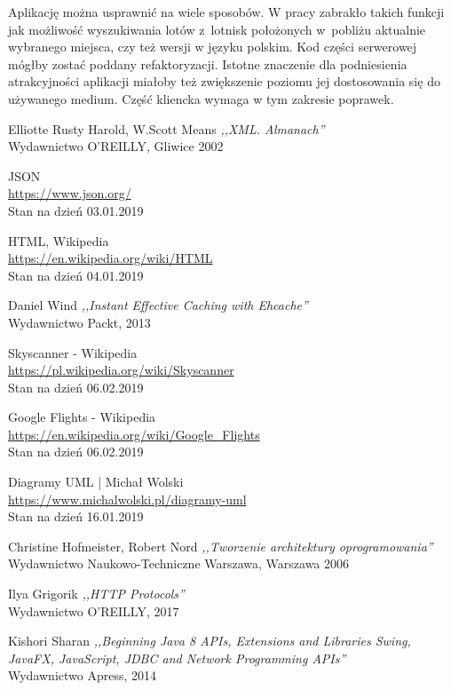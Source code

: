 \documentclass[12pt, twoside]{report}
\begin{document}
Aplikację można usprawnić na wiele sposobów. W pracy zabrakło takich funkcji jak możliwość wyszukiwania lotów z~lotnisk położonych w~pobliżu aktualnie wybranego miejsca, czy też  wersji w języku polskim. Kod części serwerowej mógłby zostać poddany refaktoryzacji. Istotne znaczenie dla podniesienia atrakcyjności aplikacji miałoby też zwiększenie poziomu jej dostosowania się do używanego medium. Część kliencka wymaga w tym zakresie poprawek. 
\begin{thebibliography}{9}

Elliotte Rusty Harold, W.Scott Means \emph{ ,,XML. Almanach'' } \\
Wydawnictwo O'REILLY, Gliwice 2002

  JSON \\
  \url{https://www.json.org/} \\
  Stan na dzień 03.01.2019

    HTML, Wikipedia \\
	\url{https://en.wikipedia.org/wiki/HTML} \\
	Stan na dzień 04.01.2019
	
Daniel Wind \emph{ ,,Instant Effective Caching with Ehcache'' }\\
Wydawnictwo Packt, 2013

	Skyscanner - Wikipedia \\
	\url{https://pl.wikipedia.org/wiki/Skyscanner} \\
	Stan na dzień 06.02.2019
	
	Google Flights - Wikipedia \\
	\url{https://en.wikipedia.org/wiki/Google_Flights} \\
	Stan na dzień 06.02.2019
	
	Diagramy UML | Michał Wolski\\ \url{https://www.michalwolski.pl/diagramy-uml} \\
	Stan na dzień 16.01.2019
	
Christine Hofmeister, Robert Nord \emph{ ,,Tworzenie architektury oprogramowania''} \\
Wydawnictwo Naukowo-Techniczne Warszawa, Warszawa 2006

Ilya Grigorik \emph{ ,,HTTP Protocols'' }\\ Wydawnictwo O'REILLY, 2017

Kishori Sharan \emph{ ,,Beginning Java 8 APIs, Extensions and Libraries Swing, JavaFX, JavaScript, JDBC and Network Programming APIs'' }\\ Wydawnictwo Apress, 2014 
 

\end{thebibliography}
\end{document}

